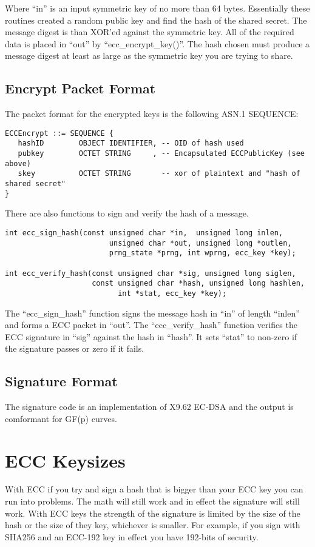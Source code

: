 \documentclass[a4paper]{book}
\begin{document}
Where ``in'' is an input symmetric key of no more than 64 bytes.  Essentially these routines created a random public key
and find the hash of the shared secret.  The message digest is than XOR'ed against the symmetric key.  All of the required
data is placed in ``out'' by ``ecc\_encrypt\_key()''.   The hash chosen must produce a message digest at least as large
as the symmetric key you are trying to share.

\subsection{Encrypt Packet Format}

The packet format for the encrypted keys is the following ASN.1 SEQUENCE:

\begin{verbatim}
ECCEncrypt ::= SEQUENCE {
   hashID        OBJECT IDENTIFIER, -- OID of hash used
   pubkey        OCTET STRING     , -- Encapsulated ECCPublicKey (see above)
   skey          OCTET STRING       -- xor of plaintext and "hash of shared secret"
}
\end{verbatim}

There are also functions to sign and verify the hash of a message.
 
\begin{verbatim}
int ecc_sign_hash(const unsigned char *in,  unsigned long inlen,
                        unsigned char *out, unsigned long *outlen,
                        prng_state *prng, int wprng, ecc_key *key);

int ecc_verify_hash(const unsigned char *sig, unsigned long siglen,
                    const unsigned char *hash, unsigned long hashlen, 
                          int *stat, ecc_key *key);
\end{verbatim}

The ``ecc\_sign\_hash'' function signs the message hash in ``in'' of length ``inlen'' and forms a ECC packet in ``out''.  
The ``ecc\_verify\_hash'' function verifies the ECC signature in ``sig'' against the hash in ``hash''.  It sets ``stat''
to non-zero if the signature passes or zero if it fails.

\subsection{Signature Format}
The signature code is an implementation of X9.62 EC-DSA and the output is comformant for GF(p) curves.

\section{ECC Keysizes}
With ECC if you try and sign a hash that is bigger than your ECC key you can run into problems.  The math will still work
and in effect the signature will still work.  With ECC keys the strength of the signature is limited by the size of
the hash or the size of they key, whichever is smaller.  For example, if you sign with SHA256 and an ECC-192 key in effect
you have 192-bits of security.  
\end{document}
